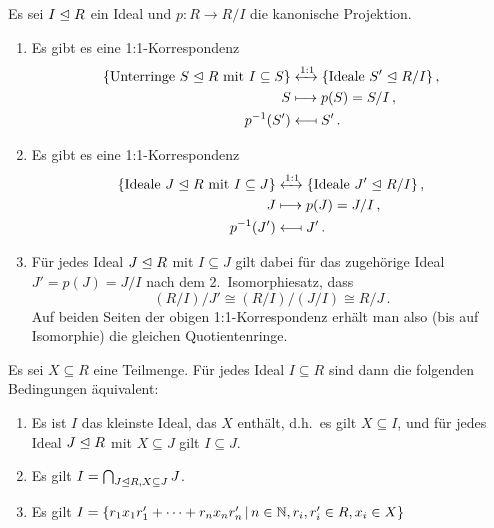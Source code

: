 \begin{lemma}
  \label{lemma: correspondence between ideals}
  Es sei $I \mathrel{\trianglelefteq} R$ ein Ideal und $p \colon R \to R/I$ die kanonische Projektion.
  \begin{enumerate}
    \item
      Es gibt es eine 1:1-Korrespondenz
      \begin{align*}
        \{ \text{Unterringe $S \mathrel{\trianglelefteq} R$ mit $I \subseteq S$} \}
        &\xleftrightarrow{1:1}
        \{ \text{Ideale $S' \mathrel{\trianglelefteq} R/I$} \} \,,
        \\
        S
        &\longmapsto
        p(S)
        =
        S/I \,,
        \\
        p^{-1}(S')
        &\longmapsfrom
        S' \,.
      \end{align*}
    \item
      Es gibt es eine 1:1-Korrespondenz
      \begin{align*}
        \{ \text{Ideale $J \mathrel{\trianglelefteq} R$ mit $I \subseteq J$} \}
        &\xleftrightarrow{1:1}
        \{ \text{Ideale $J' \mathrel{\trianglelefteq} R/I$} \} \,,
        \\
        J
        &\longmapsto
        p(J)
        =
        J/I \,,
        \\
        p^{-1}(J')
        &\longmapsfrom
        J' \,.
      \end{align*}
    \item
      Für jedes Ideal $J \mathrel{\trianglelefteq} R$ mit $I \subseteq J$ gilt dabei für das zugehörige Ideal $J' = p(J) = J/I$ nach dem 2.\ Isomorphiesatz, dass
      \[
              (R/I)/J'
        \cong (R/I)/(J/I)
        \cong  R/J \,.
      \]
      Auf beiden Seiten der obigen 1:1-Korrespondenz erhält man also \textup(bis auf Isomorphie\textup) die gleichen Quotientenringe.
  \end{enumerate}

  
\end{lemma}

Es sei $X \subseteq R$ eine Teilmenge.
Für jedes Ideal $I \subseteq R$ sind dann die folgenden Bedingungen äquivalent:

\begin{enumerate}
  \item
    Es ist $I$ das kleinste Ideal, das $X$ enthält, d.h.\ es gilt $X \subseteq I$, und für jedes Ideal $J \mathrel{\trianglelefteq} R$ mit $X \subseteq J$ gilt $I \subseteq J$.
  \item
    Es gilt $I = \bigcap_{J \mathrel{\trianglelefteq} R, X \subseteq J} J$.
  \item
    Es gilt
    $
        I
      = \{
          r_1 x_1 r'_1 + \dotsb + r_n x_n r'_n
        \suchthat
          n \in \Natural,
          r_i, r'_i \in R,
          x_i \in X
        \}
    $
\end{enumerate}


